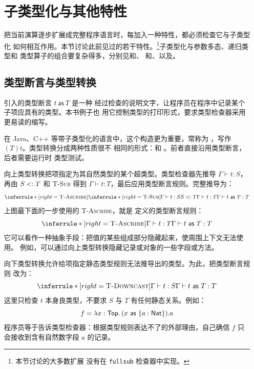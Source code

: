 \section{子类型化与其他特性}
\label{sec:15.5}

把当前演算逐步扩展成完整程序语言时，每加入一种特性，都必须检查它与子类型化
如何相互作用。本节讨论此前见过的若干特性。\footnote{本节讨论的大多数扩展
没有在 \texttt{fullsub} 检查器中实现。}子类型化与参数多态、递归类型和
类型算子的组合要复杂得多，分别见和、
和、以及。

\subsection*{类型断言与类型转换}

引入的类型断言 \(t\ \mathsf{as}\ T\) 是一种
经过检查的说明文字，让程序员在程序中记录某个子项应具有的类型。本书例子也
用它控制类型的打印形式，要求类型检查器采用更易读的缩写。

在 Java、C++ 等带子类型化的语言中，这个构造更为重要，常称为
，写作 \((T)t\)。类型转换分成两种性质很不
相同的形式：和
。前者直接沿用类型断言，后者需要运行时
类型测试。

向上类型转换把项指定为其自然类型的某个超类型。类型检查器先推导
\(\Gamma\vdash t:S\)，再由 \(S\mathrel{<:} T\) 和 \textsc{T-Sub} 得到
\(\Gamma\vdash t:T\)，最后应用类型断言规则。完整推导为：
\[
\inferrule*[right=\textsc{T-Ascribe}]
 {\inferrule*[right=\textsc{T-Sub}]
   {\Gamma\vdash t:S\\S\subtype T}
   {\Gamma\vdash t:T}}
 {\Gamma\vdash t\ \mathsf{as}\ T:T}
\]
上图最下面的一步使用的 \textsc{T-Ascribe}，就是
定义的类型断言规则：
\[
\inferrule*[right=\textsc{T-Ascribe}]
 {\Gamma\vdash t:T}{\Gamma\vdash t\ \mathsf{as}\ T:T}
\]
它可以看作一种抽象手段：把值的某些组成部分隐藏起来，使周围上下文无法使用。
例如，可以通过向上类型转换隐藏记录或对象的一些字段或方法。

向下类型转换允许给项指定静态类型规则无法推导出的类型。为此，把类型断言规则
改为：
\[
\inferrule*[right=\textsc{T-Downcast}]
 {\Gamma\vdash t:S}{\Gamma\vdash t\ \mathsf{as}\ T:T}
\]
这里只检查 \(t\) 本身良类型，不要求 \(S\) 与 \(T\) 有任何静态关系。例如：
\[
f=\lambda x:\mathsf{Top}.\,(x\ \mathsf{as}\
\{a:\mathsf{Nat}\}).a
\]
程序员等于告诉类型检查器：根据类型规则表达不了的外部理由，自己确信 \(f\)
只会接收到含有自然数字段 \(a\) 的记录。

